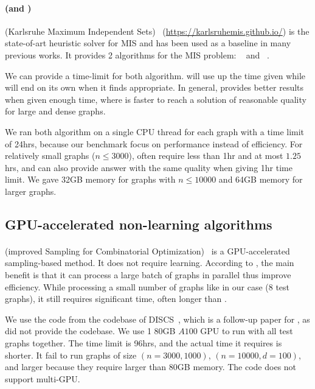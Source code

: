 \paragraph{\kamis (\onlinemis and \redumis)}
\kamis(Karlsruhe Maximum Independent Sets)~\citep{lamm2017finding} (\url{https://karlsruhemis.github.io/}) is the state-of-art heuristic solver for MIS and has been used as a baseline in many previous works. It provides 2 algorithms for the MIS problem: \redumis~\citep{lamm2017finding} and \onlinemis~\citep{dahlum2016accelerating}.

We can provide a time-limit for both algorithm. \onlinemis will use up the time given while \redumis will end on its own when it finds appropriate. In general, \redumis provides better results when given enough time, where \onlinemis is faster to reach a solution of reasonable quality for large and dense graphs.

We ran both algorithm on a single CPU thread for each graph with a time limit of 24hrs, because our benchmark focus on performance instead of efficiency. For relatively small graphs ($n\leq 3000$), \redumis often require less than 1hr and at most $1.25$hrs, and  \onlinemis can also provide answer with the same quality when giving 1hr time limit.  We gave 32GB memory for graphs with $n\leq 10000$ and 64GB memory for larger graphs. 

\subsection{GPU-accelerated non-learning algorithms}
\paragraph{\isco}
\isco(improved Sampling for Combinatorial Optimization)~\citep{sun2023revisiting}  is a GPU-accelerated sampling-based method. It does not require learning. According to \citep{sun2023revisiting}, the main benefit is that it can process a large batch of graphs in parallel thus improve efficiency. While processing a small number of graphs like in our case (8 test graphs), it still requires significant time, often longer than \redumis. 

We use the code from the codebase of DISCS~\citep{goshvadi2024discs}, which is a follow-up paper for \isco, as \isco did not provide the codebase. We use 1 80GB $A100$ GPU to run \isco with all test graphs together. The time limit is 96hrs, and the actual time it requires is shorter. It fail to run graphs of size $(n=3000,1000)$, $(n=10000, d=100)$, and larger because they require larger than 80GB memory. The code does not support multi-GPU.

